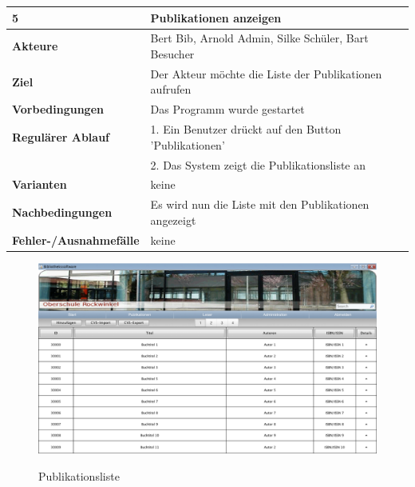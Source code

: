 \documentclass[fontsize=12pt,paper=a4,twoside]{scrartcl}
\begin{document}
\begin{table}[htbp]
\label{5}
\begin{tabular}{|l|p{10cm}|}
\hline 
\textbf{5} & \textbf{Publikationen anzeigen} \\ \hline
\textbf{Akteure} & Bert Bib, Arnold Admin, Silke Schüler, Bart Besucher\\ \hline
\textbf{Ziel} & Der Akteur möchte die Liste der Publikationen aufrufen  \\ \hline
\textbf{Vorbedingungen} & Das Programm wurde gestartet  \\ \hline
\textbf{Regulärer Ablauf} & 
1. Ein Benutzer drückt auf den Button 'Publikationen' \\
&2. Das System zeigt die Publikationsliste an\\
\hline
\textbf{Varianten} & 
keine \\ \hline
\textbf{Nachbedingungen} & Es wird nun die Liste mit den Publikationen angezeigt \\ \hline
\textbf{Fehler-/Ausnahmefälle} & keine\\
\hline
\end{tabular}
\end{table}

\begin{figure}[htbp]
\caption{Publikationsliste}
\includegraphics[width=1\textwidth]{ScreensWebsite/PublikationslisteLoggedInBibliothekar.png}
\label{Publikationsliste}
\end{figure}
\end{document}
